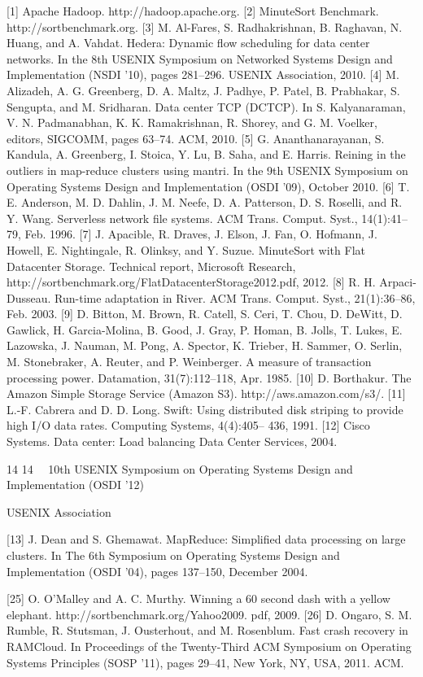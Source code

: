 [1] Apache Hadoop. http://hadoop.apache.org.
[2] MinuteSort Benchmark. http://sortbenchmark.org.
[3] M. Al-Fares, S. Radhakrishnan, B. Raghavan, N. Huang, and
A. Vahdat. Hedera: Dynamic flow scheduling for data center networks. In the 8th USENIX Symposium on Networked Systems Design and Implementation (NSDI ’10), pages 281–296. USENIX
Association, 2010.
[4] M. Alizadeh, A. G. Greenberg, D. A. Maltz, J. Padhye, P. Patel,
B. Prabhakar, S. Sengupta, and M. Sridharan. Data center TCP
(DCTCP). In S. Kalyanaraman, V. N. Padmanabhan, K. K. Ramakrishnan, R. Shorey, and G. M. Voelker, editors, SIGCOMM,
pages 63–74. ACM, 2010.
[5] G. Ananthanarayanan, S. Kandula, A. Greenberg, I. Stoica, Y. Lu,
B. Saha, and E. Harris. Reining in the outliers in map-reduce clusters using mantri. In the 9th USENIX Symposium on Operating
Systems Design and Implementation (OSDI ’09), October 2010.
[6] T. E. Anderson, M. D. Dahlin, J. M. Neefe, D. A. Patterson, D. S.
Roselli, and R. Y. Wang. Serverless network file systems. ACM
Trans. Comput. Syst., 14(1):41–79, Feb. 1996.
[7] J. Apacible, R. Draves, J. Elson, J. Fan, O. Hofmann, J. Howell, E. Nightingale, R. Olinksy, and Y. Suzue. MinuteSort with
Flat Datacenter Storage. Technical report, Microsoft Research,
http://sortbenchmark.org/FlatDatacenterStorage2012.pdf, 2012.
[8] R. H. Arpaci-Dusseau. Run-time adaptation in River. ACM Trans.
Comput. Syst., 21(1):36–86, Feb. 2003.
[9] D. Bitton, M. Brown, R. Catell, S. Ceri, T. Chou, D. DeWitt,
D. Gawlick, H. Garcia-Molina, B. Good, J. Gray, P. Homan,
B. Jolls, T. Lukes, E. Lazowska, J. Nauman, M. Pong, A. Spector, K. Trieber, H. Sammer, O. Serlin, M. Stonebraker, A. Reuter,
and P. Weinberger. A measure of transaction processing power.
Datamation, 31(7):112–118, Apr. 1985.
[10] D. Borthakur. The Amazon Simple Storage Service (Amazon
S3). http://aws.amazon.com/s3/.
[11] L.-F. Cabrera and D. D. Long. Swift: Using distributed disk striping to provide high I/O data rates. Computing Systems, 4(4):405–
436, 1991.
[12] Cisco Systems. Data center: Load balancing Data Center Services, 2004.

14
14  10th USENIX Symposium on Operating Systems Design and Implementation (OSDI ’12) 

USENIX Association


[13] J. Dean and S. Ghemawat. MapReduce: Simplified data processing on large clusters. In The 6th Symposium on Operating
Systems Design and Implementation (OSDI ’04), pages 137–150,
December 2004.

[25] O. O’Malley and A. C. Murthy. Winning a 60 second dash with
a yellow elephant. http://sortbenchmark.org/Yahoo2009.
pdf, 2009.
[26] D. Ongaro, S. M. Rumble, R. Stutsman, J. Ousterhout, and
M. Rosenblum. Fast crash recovery in RAMCloud. In Proceedings of the Twenty-Third ACM Symposium on Operating Systems
Principles (SOSP ’11), pages 29–41, New York, NY, USA, 2011.
ACM.

